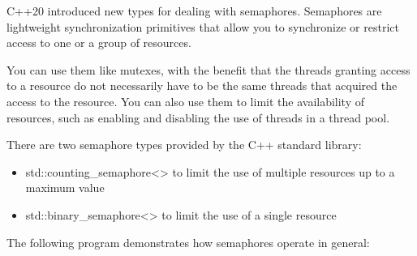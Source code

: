 
C++20 introduced new types for dealing with semaphores. Semaphores are lightweight synchronization primitives that allow you to synchronize or restrict access to one or a group of resources.

You can use them like mutexes, with the benefit that the threads granting access to a resource do not necessarily have to be the same threads that acquired the access to the resource. You can also use them to limit the availability of resources, such as enabling and disabling the use of threads in a thread pool.

There are two semaphore types provided by the C++ standard library:

\begin{itemize}
\item 
std::counting\_semaphore<> to limit the use of multiple resources up to a maximum value

\item
std::binary\_semaphore<> to limit the use of a single resource
\end{itemize}


The following program demonstrates how semaphores operate in general:


